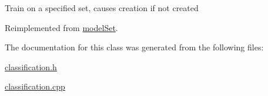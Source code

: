 Train on a specified set, causes creation if not created 

Reimplemented from \hyperlink{classmodel_set_a7620f95e8e29d547e7c688da51b33d9c}{model\+Set}.



The documentation for this class was generated from the following files\+:\begin{DoxyCompactItemize}
\item 
\hyperlink{classification_8h}{classification.\+h}\item 
\hyperlink{classification_8cpp}{classification.\+cpp}\end{DoxyCompactItemize}
